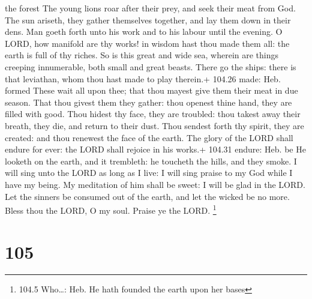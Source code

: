 the forest  The young lions roar after their prey, and seek
their meat from God.  The sun ariseth, they gather
themselves together, and lay them down in their dens.  Man
goeth forth unto his work and to his labour until the evening.
 O LORD, how manifold are thy works! in wisdom hast thou
made them all: the earth is full of thy riches.  So is this
great and wide sea, wherein are things creeping innumerable, both small
and great beasts.  There go the ships: there is that
leviathan, whom thou hast made to play therein.+ 104.26 made: Heb.
formed  These wait all upon thee; that thou mayest give
them their meat in due season.  That thou givest them they
gather: thou openest thine hand, they are filled with good.
 Thou hidest thy face, they are troubled: thou takest away
their breath, they die, and return to their dust.  Thou
sendest forth thy spirit, they are created: and thou renewest the face
of the earth.  The glory of the LORD shall endure for ever:
the LORD shall rejoice in his works.+ 104.31 endure: Heb. be
 He looketh on the earth, and it trembleth: he toucheth the
hills, and they smoke.  I will sing unto the LORD as long
as I live: I will sing praise to my God while I have my being.
 My meditation of him shall be sweet: I will be glad in the
LORD.  Let the sinners be consumed out of the earth, and
let the wicked be no more. Bless thou the LORD, O my soul. Praise ye the
LORD. \footnote{104.5 Who\ldots: Heb. He hath founded the earth upon her
  bases}

\hypertarget{section-104}{%
\section{105}\label{section-104}}

